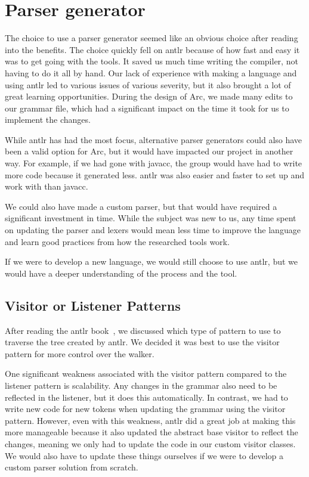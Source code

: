\section{Parser generator}\label{sec:discussion_parserGenerator}

The choice to use a parser generator seemed like an obvious choice after reading into the benefits. The choice quickly fell on \gls{antlr} because of how fast and easy it was to get going with the tools. It saved us much time writing the compiler, not having to do it all by hand. Our lack of experience with making a language and using \gls{antlr} led to various issues of various severity, but it also brought a lot of great learning opportunities. During the design of Arc, we made many edits to our grammar file, which had a significant impact on the time it took for us to implement the changes. 

While \gls{antlr} has had the most focus, alternative parser generators could also have been a valid option for Arc, but it would have impacted our project in another way. For example, if we had gone with \gls{javacc}, the group would have had to write more code because it generated less. \gls{antlr} was also easier and faster to set up and work with than \gls{javacc}.

We could also have made a custom parser, but that would have required a significant investment in time. While the subject was new to us, any time spent on updating the parser and lexers would mean less time to improve the language and learn good practices from how the researched tools work. 

If we were to develop a new language, we would still choose to use \gls{antlr}, but we would have a deeper understanding of the process and the tool.

\subsection{Visitor or Listener Patterns}

After reading the \gls{antlr} book~\cite{Parr2014}, we discussed which type of pattern to use to traverse the tree created by \gls{antlr}. We decided it was best to use the visitor pattern for more control over the walker. 

One significant weakness associated with the visitor pattern compared to the listener pattern is scalability. Any changes in the grammar also need to be reflected in the listener, but it does this automatically. In contrast, we had to write new code for new tokens when updating the grammar using the visitor pattern. However, even with this weakness, \gls{antlr} did a great job at making this more manageable because it also updated the abstract base visitor to reflect the changes, meaning we only had to update the code in our custom visitor classes. We would also have to update these things ourselves if we were to develop a custom parser solution from scratch.